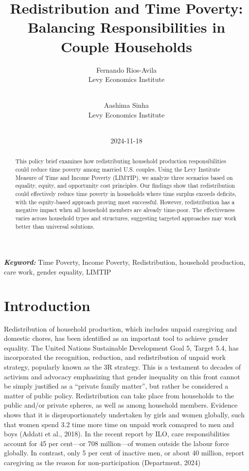 \documentclass[
  11pt,
]{article}
\title{Redistribution and Time Poverty: Balancing Responsibilities in
Couple Households}
\author{
Fernando Rios-Avila\\
Levy Economics Institute\\
\\
\and 
Aashima Sinha\\
Levy Economics Institute\\
\\
}
\date{2024-11-18}
\begin{document}
\def\spacingset#1{\renewcommand{\baselinestretch}%
{#1}\small\normalsize} \spacingset{1}


\maketitle
\begin{abstract}
This policy brief examines how redistributing household production
responsibilities could reduce time poverty among married U.S. couples.
Using the Levy Institute Measure of Time and Income Poverty (LIMTIP), we
analyze three scenarios based on equality, equity, and opportunity cost
principles. Our findings show that redistribution could effectively
reduce time poverty in households where time surplus exceeds deficits,
with the equity-based approach proving most successful. However,
redistribution has a megative impact when all household members are
already time-poor. The effectiveness varies across household types and
structures, suggesting targeted approaches may work better than
universal solutions.
\end{abstract}
 
\vspace{.2in}

\textbf{\textit{Keyword: }}Time Poverty, Income Poverty, Redistribution,
household production, care work, gender equality, LIMTIP


\thispagestyle{empty}
\clearpage{}
\newpage
\spacingset{1.2} %
\section{Introduction}\label{introduction}

Redistribution of household production, which includes unpaid caregiving
and domestic chores, has been identified as an important tool to achieve
gender equality. The United Nations Sustainable Development Goal 5,
Target 5.4, has incorporated the recognition, reduction, and
redistribution of unpaid work strategy, popularly known as the 3R
strategy. This is a testament to decades of activism and advocacy
emphasizing that gender inequality on this front cannot be simply
justified as a ``private family matter'', but rather be considered a
matter of public policy. Redistribution can take place from households
to the public and/or private spheres, as well as among household
members. Evidence shows that it is disproportionately undertaken by
girls and women globally, such that women spend 3.2 time more time on
unpaid work comapred to men and boys (Addati et al., 2018). In the
recent report by ILO, care responsibilities account for 45 per cent---or
708 million---of women outside the labour force globally. In contrast,
only 5 per cent of inactive men, or about 40 million, report caregiving
as the reason for non-participation (Department, 2024)
\end{document}
